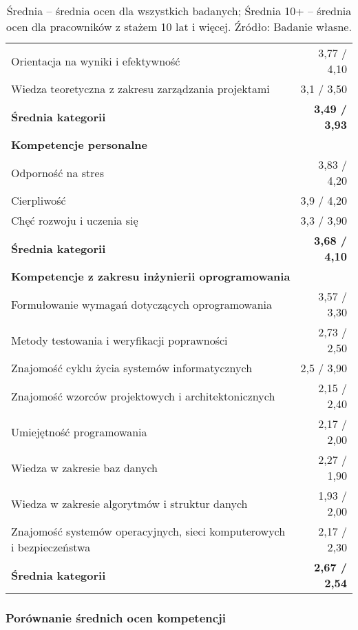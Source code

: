 \begin{table}[htbp]
\begin{tabular}{p{10cm} r}
Orientacja na wyniki i efektywność & 3{,}77 / 4{,}10 \\
Wiedza teoretyczna z zakresu zarządzania projektami & 3{,}1 / 3{,}50 \\
\textbf{Średnia kategorii} & \textbf{3{,}49 / 3{,}93} \\
\midrule
\multicolumn{2}{l}{\textbf{Kompetencje personalne}} \\
Odporność na stres & 3{,}83 / 4{,}20 \\
Cierpliwość & 3{,}9 / 4{,}20 \\
Chęć rozwoju i uczenia się & 3{,}3 / 3{,}90 \\
\textbf{Średnia kategorii} & \textbf{3{,}68 / 4{,}10} \\
\midrule
\multicolumn{2}{l}{\textbf{Kompetencje z zakresu inżynierii oprogramowania}} \\
Formułowanie wymagań dotyczących oprogramowania & 3{,}57 / 3{,}30 \\
Metody testowania i weryfikacji poprawności & 2{,}73 / 2{,}50 \\
Znajomość cyklu życia systemów informatycznych & 2{,}5 / 3{,}90 \\
Znajomość wzorców projektowych i architektonicznych & 2{,}15 / 2{,}40 \\
Umiejętność programowania & 2{,}17 / 2{,}00 \\
Wiedza w zakresie baz danych & 2{,}27 / 1{,}90 \\
Wiedza w zakresie algorytmów i struktur danych & 1{,}93 / 2{,}00 \\
Znajomość systemów operacyjnych, sieci komputerowych i bezpieczeństwa & 2{,}17 / 2{,}30 \\
\textbf{Średnia kategorii} & \textbf{2{,}67 / 2{,}54} \\
\bottomrule
\end{tabular}
\caption*{Średnia – średnia ocen dla wszystkich badanych; Średnia 10+ – średnia ocen dla pracowników z stażem 10 lat i więcej. Źródło: Badanie własne.}
\end{table}

\subsubsection{Porównanie średnich ocen kompetencji}

